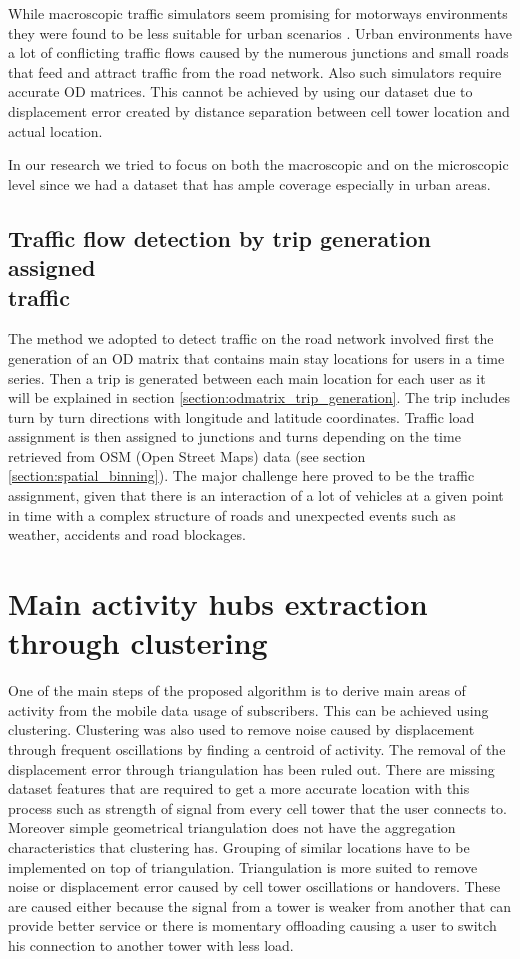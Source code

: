 \documentclass[12pt, a4paper]{report}
\theoremstyle{definition}
\theoremstyle{definition}%
\theoremstyle{definition}%
\theoremstyle{definition}%
\theoremstyle{definition}%
\theoremstyle{definition}%
\begin{document}
While macroscopic traffic simulators seem promising for motorways environments they were found to be less suitable for urban scenarios \cite{Bazghandi2012}. Urban environments have a lot of conflicting traffic flows caused by the numerous junctions and small roads that feed and attract traffic from the road network. Also such simulators require accurate OD matrices. This cannot be achieved by using our dataset due to displacement error created by distance separation between cell tower location and actual location.

In our research we tried to focus on both the macroscopic and on the microscopic level since we had a dataset that has ample coverage especially in urban areas.    


\subsection{Traffic flow detection by trip generation assigned\\ traffic} \label{subsection:methodology:trip_generation}
The method we adopted to detect traffic on the road network involved first the generation of an OD matrix that contains main stay locations for users in a time series. Then a trip is generated between each main location for each user as it will be explained in section \ref{section:odmatrix_trip_generation}. The trip includes turn by turn directions with longitude and latitude coordinates. Traffic load assignment is then assigned to junctions and turns depending on the time retrieved from OSM (Open Street Maps) data (see section \ref{section:spatial_binning}). The major challenge here proved to be the traffic assignment, given that there is an interaction of a lot of vehicles at a given point in time with a complex structure of roads and unexpected events such as weather, accidents and road blockages. 


\section{Main activity hubs extraction through clustering} \label{section:methodology:clustering}

One of the main steps of the proposed algorithm is to derive main areas of activity from the mobile data usage of subscribers. This can be achieved using clustering. Clustering was also used to remove noise caused by displacement through frequent oscillations by finding a centroid of activity. The removal of the displacement error through triangulation has been ruled out. There are missing dataset features that are required to get a more accurate location with this process such as strength of signal from every cell tower that the user connects to. Moreover simple geometrical triangulation does not have the aggregation characteristics that clustering has. Grouping of similar locations have to be implemented on top of triangulation. Triangulation is more suited to remove noise or displacement error caused by cell tower oscillations or handovers. These are caused either because the signal from a tower is weaker from another that can provide better service or there is momentary offloading causing a user to switch his connection to another tower with less load. 
\end{document}
